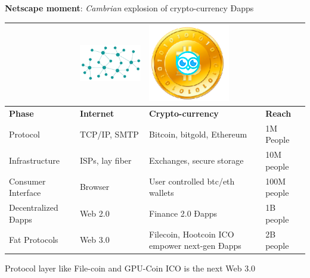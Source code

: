 \textbf{Netscape moment}: \emph{Cambrian} explosion of crypto-currency Ðapps
 

 \begin{adjustbox}{width=.8\textwidth}
\begin{tabularx} {\textwidth}{|X|X|X|X|}
    \hline
&    \includegraphics[scale=0.2]{static/decentnew} &     \includegraphics[scale=0.2]{static/hootcoin} & \\
    \hline
\textbf{Phase} & \textbf{Internet} & \textbf{Crypto-currency} & \textbf{Reach}\\
\hline
Protocol & TCP/IP, SMTP & Bitcoin, bitgold, Ethereum & 1M People \\
\hline
Infrastructure & ISPs, lay fiber & Exchanges, secure storage & 10M people \\
\hline
Consumer Interface & Browser & User controlled btc/eth wallets & 100M people \\
\hline
Decentralized Ðapps &  Web 2.0  & Finance 2.0 Ðapps & 1B people\\
\hline
Fat Protocols &  Web 3.0  & Filecoin, Hootcoin ICO empower next-gen Ðapps & 2B people\\

\hline
\end{tabularx}
\end{adjustbox}

Protocol layer like File-coin and GPU-Coin ICO is the next Web 3.0
